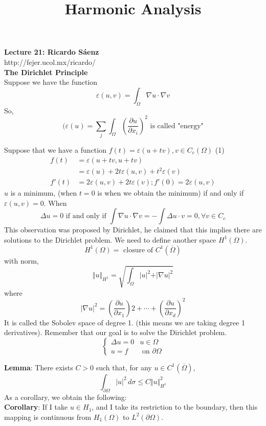 \documentclass[12pt]{article}
\title{Harmonic Analysis}
\begin{document}
\noindent \textbf{Lecture 21: Ricardo S\'aenz} \\
\noindent http://fejer.ucol.mx/ricardo/ \\

\noindent \textbf{The Dirichlet Principle} \\
\noindent Suppose we have the function
$$\varepsilon(u,v) = \int_{\Omega} \nabla u \cdot \nabla v$$
So, 
$$(\varepsilon(u) = \sum_j \int_\Omega (\frac{\partial u}{\partial x_i})^2 \text{ is called "energy"}$$

Suppose that we have a function 
$f(t) = \varepsilon(u+tv), v \in C_c (\Omega)$
(1)
\begin{align*}
f(t) &= \varepsilon(u+tv, u+tv) \\
&= \varepsilon(u) + 2t\varepsilon(u,v) + t^2\varepsilon(v) \\
f'(t) &= 2\varepsilon(u,v) + 2t \varepsilon(v); f'(0) = 2\varepsilon(u,v)
\end{align*}
$u$ is a minimum, (when $t=0$ is when we obtain the minimum) if and only if $\varepsilon(u,v)=0$.  When
$$\Delta u =0 \text{ if and only if } \int \nabla u \cdot \nabla v  = - \int \Delta u \cdot v = 0, \forall v \in C_c$$
This observation was proposed by Dirichlet, he claimed that this implies there are solutions to the Dirichlet problem. We need to define another space $H^1(\Omega)$. 
$$H^1(\Omega) = \text{ closure of } C^1(\overline{\Omega})$$
with norm,
$$\Vert u \Vert_{H^1} = \sqrt{\int_\Omega \vert u \vert^2 + \vert \nabla u \vert^2}$$
where 
$$\vert \nabla u \vert^2 = (\frac{\partial u}{\partial x_1})2 + \cdots + (\frac{\partial u}{\partial x_d})^2$$
It is called the Sobolev space of degree 1. (this means we are taking degree 1 derivatives). Remember that our goal is to solve the Dirichlet problem. 
$$\begin{cases} \Delta u = 0 & u \in \Omega \\ u = f & \text{ on } \partial\Omega\end{cases}$$

\noindent \textbf{Lemma}: There exists $C>0$ such that, for any $u \in C^1(\overline{\Omega})$, 
$$\int_{\partial\Omega} \vert u \vert ^2 \, d\sigma \leq C \Vert u \Vert_{H^1}^2$$
As a corollary, we obtain the following: \\

\noindent \textbf{Corollary}: If I take $u \in H_1$, and I take its restriction to the boundary, then this mapping is continuous from $H_1(\Omega)$ to $L^2(\partial\Omega)$. \\
\end{document}
